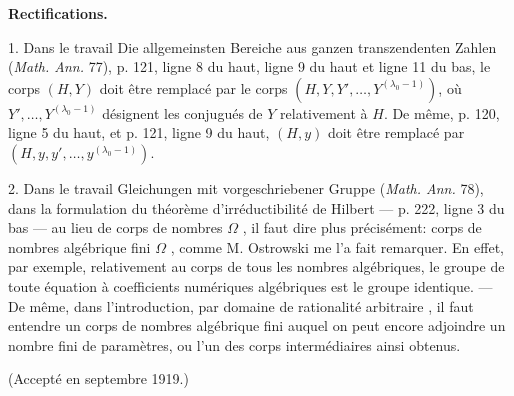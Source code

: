 \begin{center}
\textbf{Rectifications.}
\end{center}

1. Dans le travail \og{} Die allgemeinsten Bereiche aus ganzen transzendenten Zahlen \fg{} (\emph{Math. Ann.} 77), p. 121, ligne 8 du haut, ligne 9 du haut et ligne 11 du bas, le corps $(H,Y)$ doit être remplacé par le \og{} corps $(H,Y,Y',\ldots,Y^{(\lambda_0-1)})$, où $Y',\ldots,Y^{(\lambda_0-1)}$ désignent les conjugués de $Y$ relativement à $H$. \fg{} De même, p. 120, ligne 5 du haut, et p. 121, ligne 9 du haut, $(H,y)$ doit être remplacé par $(H,y,y',\ldots,y^{(\lambda_0-1)})$.

2. Dans le travail \og{} Gleichungen mit vorgeschriebener Gruppe \fg{} (\emph{Math. Ann.} 78), dans la formulation du théorème d'irréductibilité de Hilbert --- p. 222, ligne 3 du bas --- au lieu de \og{} corps de nombres $\Omega$ \fg{}, il faut dire plus précisément: \og{} corps de nombres algébrique fini $\Omega$ \fg{}, comme M. Ostrowski me l'a fait remarquer. En effet, par exemple, relativement au corps de tous les nombres algébriques, le groupe de toute équation à coefficients numériques algébriques est le groupe identique. --- De même, dans l'introduction, par \og{} domaine de rationalité arbitraire \fg{}, il faut entendre un corps de nombres algébrique fini auquel on peut encore adjoindre un nombre fini de paramètres, ou l'un des corps intermédiaires ainsi obtenus.

\begin{center}
(Accepté en septembre 1919.)
\end{center}
